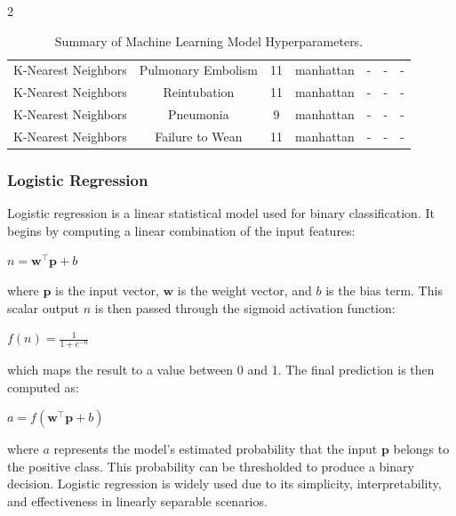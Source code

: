\documentclass[bst/sn-nature]{sn-jnl}
\begin{document}
\begin{multicols}{2}
\begin{table}
\begin{tabular}{|l|c|c|c|c|c|c|}
    \rowcolor[gray]{0.9} K-Nearest Neighbors & Pulmonary Embolism & 11 & manhattan & - & - & - \\
    K-Nearest Neighbors & Reintubation & 11 & manhattan & - & - & - \\
    \rowcolor[gray]{0.9} K-Nearest Neighbors & Pneumonia & 9 & manhattan & - & - & - \\
    K-Nearest Neighbors & Failure to Wean & 11 & manhattan & - & - & - \\
    \hline
    \end{tabular}
    \caption{Summary of Machine Learning Model Hyperparameters.}
    \label{tab:classical_hyperparams}
\end{table}

\subsubsection{Logistic Regression\cite{nndesign}}

\quad Logistic regression is a linear statistical model used for binary classification. It begins by computing a linear combination of the input features: \\

\begin{center}
    $n = \mathbf{w}^\top \mathbf{p} + b$ \vspace{0.3cm}
\end{center}

where $\mathbf{p}$ is the input vector, $\mathbf{w}$ is the weight vector, and $b$ is the bias term. This scalar output $n$ is then passed through the sigmoid activation function: \\

\begin{center}
    $f(n) = \frac{1}{1 + e^{-n}}$ \vspace{0.3cm}
\end{center}

which maps the result to a value between 0 and 1. The final prediction is then computed as: \\ 

\begin{center}
    $a = f(\mathbf{w}^\top \mathbf{p} + b)$ \vspace{0.3cm}
\end{center}

where $a$ represents the model's estimated probability that the input $\mathbf{p}$ belongs to the positive class. This probability can be thresholded to produce a binary decision. Logistic regression is widely used due to its simplicity, interpretability, and effectiveness in linearly separable scenarios.


\end{multicols}
\end{document}
